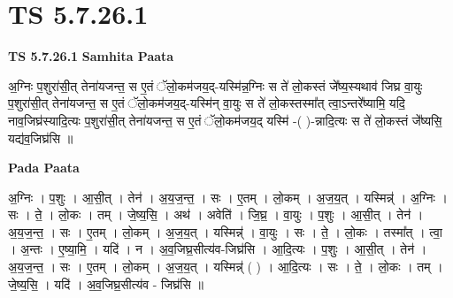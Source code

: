 \documentclass[17pt]{extarticle}
\begin{document}
\section{ TS 5.7.26.1 }

\textbf{TS 5.7.26.1 } \newline
\textbf{Samhita Paata} \newline

अ॒ग्निः प॒शुरा॑सी॒त् तेना॑यजन्त॒ स ए॒तं ॅलो॒कम॑जय॒द्-यस्मि॑न्न॒ग्निः स ते॑ लो॒कस्तं जे᳚ष्य॒स्यथाव॑ जिघ्र वा॒युः प॒शुरा॑सी॒त् तेना॑यजन्त॒ स ए॒तं ॅलो॒कम॑जय॒द्-यस्मि॑न् वा॒युः स ते॑ लो॒कस्तस्मा᳚त् त्वा॒ऽन्तरे᳚ष्यामि॒ यदि॒ नाव॒जिघ्र॑स्यादि॒त्यः प॒शुरा॑सी॒त् तेना॑यजन्त॒ स ए॒तं ॅलो॒कम॑जय॒द् यस्मि॑ -( )-न्नादि॒त्यः स ते॑ लो॒कस्तं जे᳚ष्यसि॒ यद्य॑व॒जिघ्र॑सि ॥ \newline

\textbf{Pada Paata} \newline

अ॒ग्निः । प॒शुः । आ॒सी॒त् । तेन॑ । अ॒य॒ज॒न्त॒ । सः । ए॒तम् । लो॒कम् । अ॒ज॒य॒त् । यस्मिन्न्॑ । अ॒ग्निः । सः । ते॒ । लो॒कः । तम् । जे॒ष्य॒सि॒ । अथ॑ । अवेति॑ । जि॒घ्र॒ । वा॒युः । प॒शुः । आ॒सी॒त् । तेन॑ । अ॒य॒ज॒न्त॒ । सः । ए॒तम् । लो॒कम् । अ॒ज॒य॒त् । यस्मिन्न्॑ । वा॒युः । सः । ते॒ । लो॒कः । तस्मा᳚त् । त्वा॒ । अ॒न्तः । ए॒ष्या॒मि॒ । यदि॑ । न । अ॒व॒जिघ्र॒सीत्य॑व-जिघ्र॑सि । आ॒दि॒त्यः । प॒शुः । आ॒सी॒त् । तेन॑ । अ॒य॒ज॒न्त॒ । सः । ए॒तम् । लो॒कम् । अ॒ज॒य॒त् । यस्मिन्न्॑ ( ) । आ॒दि॒त्यः । सः । ते॒ । लो॒कः । तम् । जे॒ष्य॒सि॒ । यदि॑ । अ॒व॒जिघ्र॒सीत्य॑व - जिघ्र॑सि ॥  \newline
\end{document}
